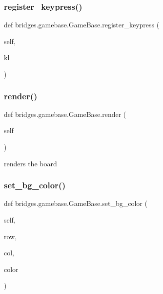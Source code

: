 \subsubsection{\texorpdfstring{register\+\_\+keypress()}{register\_keypress()}}
{\footnotesize\ttfamily def bridges.\+gamebase.\+Game\+Base.\+register\+\_\+keypress (\begin{DoxyParamCaption}\item[{}]{self,  }\item[{}]{kl }\end{DoxyParamCaption})}

\mbox{\label{classbridges_1_1gamebase_1_1_game_base_a3ae3bcb9702097029509d4123bc9276e}} 
\subsubsection{\texorpdfstring{render()}{render()}}
{\footnotesize\ttfamily def bridges.\+gamebase.\+Game\+Base.\+render (\begin{DoxyParamCaption}\item[{}]{self }\end{DoxyParamCaption})}



renders the board 

\mbox{\label{classbridges_1_1gamebase_1_1_game_base_a669740699d8d3a848172febbfbfa174f}} 
\subsubsection{\texorpdfstring{set\+\_\+bg\+\_\+color()}{set\_bg\_color()}}
{\footnotesize\ttfamily def bridges.\+gamebase.\+Game\+Base.\+set\+\_\+bg\+\_\+color (\begin{DoxyParamCaption}\item[{}]{self,  }\item[{}]{row,  }\item[{}]{col,  }\item[{}]{color }\end{DoxyParamCaption})}



